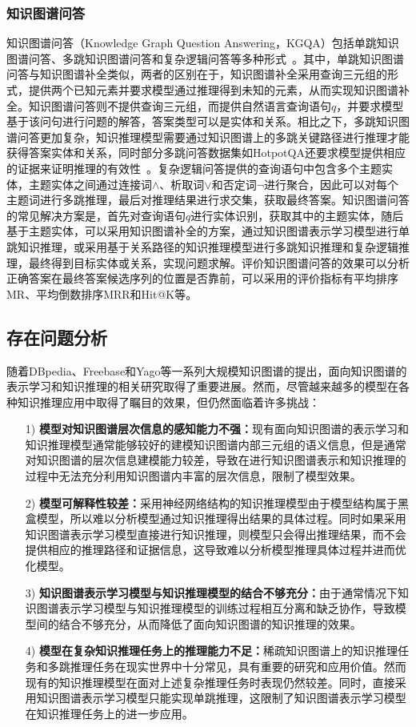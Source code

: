 \documentclass[algorithmlist, AutoFakeBold, AutoFakeSlant, figurelist, tablelist, nomlist, engineering]{seuthesix}
\begin{document}
\subsubsection{知识图谱问答}
知识图谱问答（Knowledge Graph Question Answering，KGQA）包括单跳知识图谱问答、多跳知识图谱问答和复杂逻辑问答等多种形式~\cite{saxena2020improving}。其中，单跳知识图谱问答与知识图谱补全类似，两者的区别在于，知识图谱补全采用查询三元组的形式，提供两个已知元素并要求模型通过推理得到未知的元素，从而实现知识图谱补全。知识图谱问答则不提供查询三元组，而提供自然语言查询语句$q$，并要求模型基于该问句进行问题的解答，答案类型可以是实体和关系。相比之下，多跳知识图谱问答更加复杂，知识推理模型需要通过知识图谱上的多跳关键路径进行推理才能获得答案实体和关系，同时部分多跳问答数据集如HotpotQA还要求模型提供相应的证据来证明推理的有效性~\cite{yang2018hotpotqa}。复杂逻辑问答提供的查询语句中包含多个主题实体，主题实体之间通过连接词$\land$、析取词$\vee$和否定词$\neg$进行聚合，因此可以对每个主题词进行多跳推理，最后对推理结果进行求交集，获取最终答案。知识图谱问答的常见解决方案是，首先对查询语句$q$进行实体识别，获取其中的主题实体，随后基于主题实体，可以采用知识图谱补全的方案，通过知识图谱表示学习模型进行单跳知识推理，或采用基于关系路径的知识推理模型进行多跳知识推理和复杂逻辑推理，最终得到目标实体或关系，实现问题求解。评价知识图谱问答的效果可以分析正确答案在最终答案候选序列的位置是否靠前，可以采用的评价指标有平均排序MR、平均倒数排序MRR和Hit@K等。


\subsection{存在问题分析}
随着DBpedia、Freebase和Yago等一系列大规模知识图谱的提出，面向知识图谱的表示学习和知识推理的相关研究取得了重要进展。然而，尽管越来越多的模型在各种知识推理应用中取得了瞩目的效果，但仍然面临着许多挑战：

\begin{itemize}
  \item [1)]\textbf{模型对知识图谱层次信息的感知能力不强：}现有面向知识图谱的表示学习和知识推理模型通常能够较好的建模知识图谱内部三元组的语义信息，但是通常对知识图谱的层次信息建模能力较差，导致在进行知识图谱表示和知识推理的过程中无法充分利用知识图谱内丰富的层次信息，限制了模型效果。
  \item [2)]\textbf{模型可解释性较差：}采用神经网络结构的知识推理模型由于模型结构属于黑盒模型，所以难以分析模型通过知识推理得出结果的具体过程。同时如果采用知识图谱表示学习模型直接进行知识推理，则模型只会得出推理结果，而不会提供相应的推理路径和证据信息，这导致难以分析模型推理具体过程并进而优化模型。
  \item [3)]\textbf{知识图谱表示学习模型与知识推理模型的结合不够充分：}由于通常情况下知识图谱表示学习模型与知识推理模型的训练过程相互分离和缺乏协作，导致模型间的结合不够充分，从而降低了面向知识图谱的知识推理的效果。
  \item [4)]\textbf{模型在复杂知识推理任务上的推理能力不足：}稀疏知识图谱上的知识推理任务和多跳推理任务在现实世界中十分常见，具有重要的研究和应用价值。然而现有的知识推理模型在面对上述复杂推理任务时表现仍然较差。同时，直接采用知识图谱表示学习模型只能实现单跳推理，这限制了知识图谱表示学习模型在知识推理任务上的进一步应用。
\end{itemize}
\end{document}
